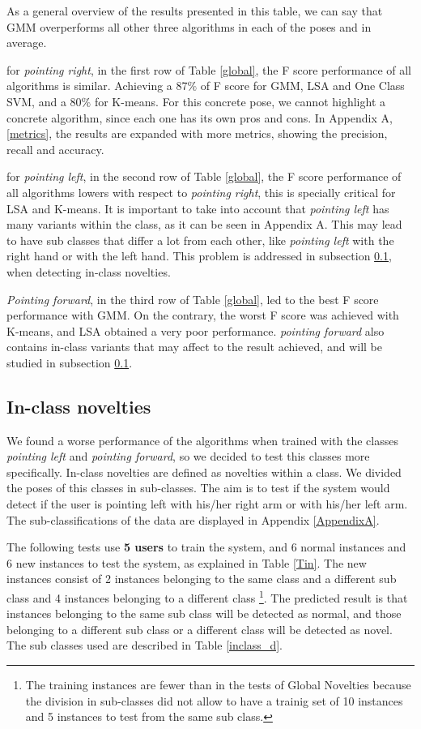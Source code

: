 As a general overview of the results presented in this table, we can say that GMM overperforms all other three algorithms in each of the poses and in average.

for \emph{pointing right}, in the first row of Table \ref{global}, the F score performance of all algorithms is similar. Achieving a 87$\%$ of F score for GMM, LSA and One Class SVM, and a 80$\%$ for K-means. For this concrete pose, we cannot highlight a concrete algorithm, since each one has its own pros and cons. In Appendix A, \ref{metrics}, the results  are expanded with more metrics, showing the precision, recall and accuracy.   

for \emph{pointing left}, in the second row of Table \ref{global}, the F score performance of all algorithms lowers with respect to \emph{pointing right}, this is specially critical for LSA and K-means. It is important to take into account that \emph{pointing left} has many variants within the class, as it can be seen in Appendix A. This may lead to have sub classes that differ a lot from each other, like \emph{pointing left} with the right hand or with the left hand. This problem is addressed in subsection \ref{in}, when detecting in-class novelties.

\emph{Pointing forward}, in the third row of Table \ref{global}, led to the best F score performance with GMM. On the contrary, the worst F score was achieved with K-means, and LSA obtained a very poor performance. \emph{pointing forward} also contains in-class variants that may affect to the result achieved, and will be studied in subsection \ref{in}. 

\subsection{In-class novelties} \label{in}

We found a worse performance of the algorithms when trained with the classes \emph{pointing left} and \emph{pointing forward}, so we decided to test this classes more specifically. In-class novelties are defined as novelties within a class. We divided the poses of this classes in sub-classes. The aim is to test if the system would detect if the user is pointing left with his/her right arm or with his/her left arm. The sub-classifications of the data are displayed in Appendix \ref{AppendixA}. 

The following tests use \textbf{5 users} to train the system, and 6 normal instances and 6 new instances to test the system, as explained in Table \ref{Tin}. The new instances consist of 2 instances belonging to the same class and a different sub class and 4 instances belonging to a different class \footnote{The training instances are fewer than in the tests of Global Novelties because the division in sub-classes did not allow to have a trainig set of 10 instances and 5 instances to test from the same sub class.}. The predicted result is that instances belonging to the same sub class will be detected as normal, and those belonging to a different sub class or a different class will be detected as novel. The sub classes used are described in Table \ref{inclass_d}. 

